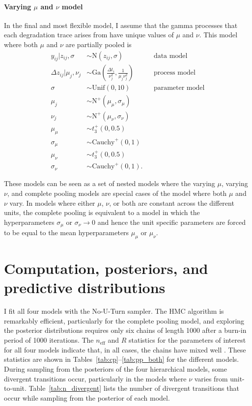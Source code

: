 \paragraph{Varying $\mu$ and $\nu$ model} In the final and most flexible model, I assume that the gamma processes that each degradation trace arises from have unique values of $\mu$ and $\nu$. This model where both $\mu$ and $\nu$ are partially pooled is
\begin{align*} 
   y_{ij}|z_{ij}, \sigma & \sim \mbox{N}(z_{ij}, \sigma)  && \mbox{data model} \\
   \Delta z_{ij}|\mu_j, \nu_j & \sim \mbox{Ga} \left( \frac{\Delta t_{i}}{\nu_j^2}, \frac{1}{\mu_j \nu_j^2} \right) && \mbox{process model} \\
   \sigma & \sim \mbox{Unif}(0, 10) && \mbox{parameter model} \\
   \mu_j & \sim \mbox{N}^{+}(\mu_{\mu}, \sigma_{\mu}) \\
   \nu_j & \sim \mbox{N}^{+}(\mu_{\nu}, \sigma_{\nu}) \\
   \mu_{\mu} & \sim t^{+}_3(0, 0.5) \\
   \sigma_{\mu} & \sim \mbox{Cauchy}^{+}(0, 1) \\
   \mu_{\nu} & \sim t^{+}_3(0, 0.5) \\
   \sigma_{\nu} & \sim \mbox{Cauchy}^{+}(0, 1).
\end{align*}

These models can be seen as a set of nested models where the varying $\mu$, varying $\nu$, and complete pooling models are special cases of the model where both $\mu$ and $\nu$ vary. In models where either $\mu$, $\nu$, or both are constant across the different units, the complete pooling is equivalent to a model in which the hyperparameters $\sigma_\mu$ or $\sigma_\nu \longrightarrow 0$ and hence the unit specific parameters are forced to be equal to the mean hyperparameters $\mu_\mu$ or $\mu_\nu$.

\section{Computation, posteriors, and predictive distributions} \label{sec:unit-to-unit-sampling}

I fit all four models with the No-U-Turn sampler. The HMC algorithm is remarkably efficient, particularly for the complete pooling model, and exploring the posterior distributions requires only six chains of length 1000 after a burn-in period of 1000 iterations. The $n_{\mbox{eff}}$ and $\hat{R}$ statistics for the parameters of interest for all four models indicate that, in all cases, the chains have mixed well \citep{Vehtari_2021}. These statistics are shown in Tables~\ref{tab:cp}--\ref{tab:pp_both} for the different models. During sampling from the posteriors of the four hierarchical models, some divergent transitions occur, particularly in the models where $\nu$ varies from unit-to-unit. Table~\ref{tab:n_divergent} lists the number of divergent transitions that occur while sampling from the posterior of each model.

